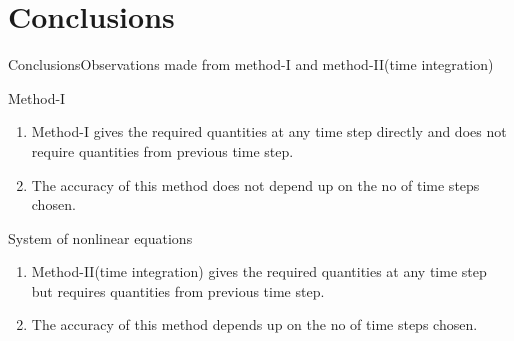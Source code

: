 \documentclass{beamer}
\begin{document}
\section{Conclusions}

\begin{frame}[t]{Conclusions}{Observations made from method-I and method-II(time integration)}
        \begin{block}{\footnotesize Method-I}
            \footnotesize
            \begin{enumerate}
                \item Method-I gives the required quantities at any time step directly and does not require quantities from previous time step.
                \item The accuracy of this method does not depend up on the no of time steps chosen.
            \end{enumerate}
        \end{block}
        \begin{block}{\footnotesize System of nonlinear equations}
            \footnotesize
            \begin{enumerate}
                \item Method-II(time integration) gives the required quantities at any time step but requires quantities from previous time step.
                \item The accuracy of this method depends up on the no of time steps chosen.
            \end{enumerate}
        \end{block}
\end{frame}
\end{document}

